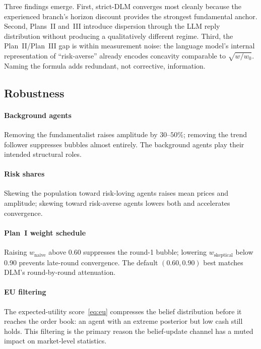 Three findings emerge.  First, strict-DLM converges most cleanly
because the experienced branch's horizon discount provides the
strongest fundamental anchor.  Second, Plans~II and~III introduce
dispersion through the LLM reply distribution without producing a
qualitatively different regime.  Third, the Plan~II/Plan~III gap is
within measurement noise: the language model's internal representation
of ``risk-averse'' already encodes concavity comparable to
$\sqrt{w/w_0}$.  Naming the formula adds redundant, not corrective,
information.

\subsection{Robustness}

\paragraph{Background agents}
Removing the fundamentalist raises amplitude by $30$--$50\%$;
removing the trend follower suppresses bubbles almost entirely.  The
background agents play their intended structural roles.

\paragraph{Risk shares}
Skewing the population toward risk-loving agents raises mean prices
and amplitude; skewing toward risk-averse agents lowers both and
accelerates convergence.

\paragraph{Plan~I weight schedule}
Raising $w_{\text{naive}}$ above 0.60 suppresses the round-1 bubble;
lowering $w_{\text{skeptical}}$ below 0.90 prevents late-round
convergence.  The default $(0.60,0.90)$ best matches DLM's
round-by-round attenuation.

\paragraph{EU filtering}
The expected-utility score~\eqref{eq:eu} compresses the belief
distribution before it reaches the order book: an agent with an
extreme posterior but low cash still holds.  This filtering is the
primary reason the belief-update channel has a muted impact on
market-level statistics.
